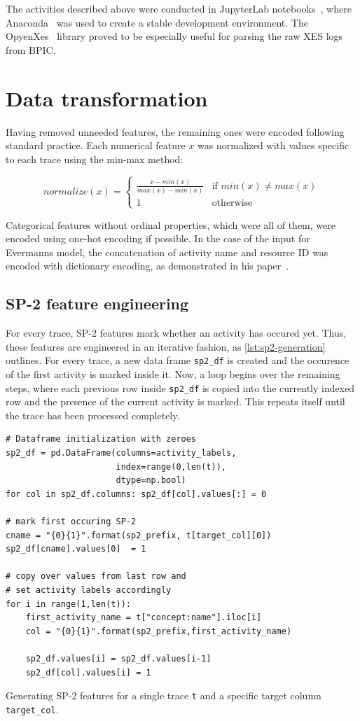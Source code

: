 The activities described above were conducted in JupyterLab notebooks~\cite{web:jupyter}, where Anaconda~\cite{web:anaconda} was used to create a stable development environment. The OpyenXes~\cite{web:opyenxes} library proved to be especially useful for parsing the raw XES logs from BPIC.

\section{Data transformation}
\label{sec:eval:data-transformation}
Having removed unneeded features, the remaining ones were encoded following standard practice. Each numerical feature $x$ was normalized with values specific to each trace using the min-max method:

$$normalize(x) =
\begin{cases}
\frac{x-min(x)}{max(x)-min(x)} & \text{if } min(x) \neq max(x)\\
1 & \text{otherwise}
\end{cases}
$$

Categorical features without ordinal properties, which were all of them, were encoded using one-hot encoding if possible. In the case of the input for Evermanns model, the concatenation of activity name and resource ID was encoded with dictionary encoding, as demonstrated in his paper~\cite{evermann2016}.

\subsection*{SP-2 feature engineering}
For every trace, SP-2 features mark whether an activity has occured yet. Thus, these features are engineered in an iterative fashion, as \autoref{lst:sp2-generation} outlines. For every trace, a new data frame \texttt{sp2\_df} is created and the occurence of the first activity is marked inside it. Now, a loop begins over the remaining steps, where each previous row inside \texttt{sp2\_df} is copied into the currently indexed row and the presence of the current activity is marked. This repeats itself until the trace has been processed completely.

\begin{listing}[ht]
\begin{verbatim}
# Dataframe initialization with zeroes
sp2_df = pd.DataFrame(columns=activity_labels,
                      index=range(0,len(t)),
                      dtype=np.bool)
for col in sp2_df.columns: sp2_df[col].values[:] = 0

# mark first occuring SP-2 
cname = "{0}{1}".format(sp2_prefix, t[target_col][0])
sp2_df[cname].values[0]  = 1

# copy over values from last row and
# set activity labels accordingly
for i in range(1,len(t)):
    first_activity_name = t["concept:name"].iloc[i]
    col = "{0}{1}".format(sp2_prefix,first_activity_name)
    
    sp2_df.values[i] = sp2_df.values[i-1]
    sp2_df[col].values[i] = 1
\end{verbatim}
\caption{Generating SP-2 features for a single trace \texttt{t} and a specific target column \texttt{target\_col}.}
\label{lst:sp2-generation}
\end{listing}

